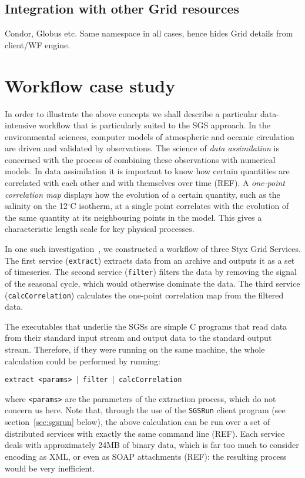 \documentclass[a4paper]{article}
\begin{document}
\subsection{Integration with other Grid resources}
Condor, Globus etc.  Same namespace in all cases, hence hides Grid details from client/WF engine.

\section{Workflow case study}
In order to illustrate the above concepts we shall describe a particular data-intensive workflow that is particularly suited to the SGS approach.  In the environmental sciences, computer models of atmospheric and oceanic circulation are driven and validated by observations.  The science of \textit{data assimilation} is concerned with the process of combining these observations with numerical models.  In data assimilation it is important to know how certain quantities are correlated with each other and with themselves over time (REF).  A \textit{one-point correlation map} displays how the evolution of a certain quantity, such as the salinity on the 12$^\circ$C isotherm, at a single point correlates with the evolution of the same quantity at its neighbouring points in the model.  This gives a characteristic length scale for key physical processes.

In one such investigation~\cite{haines:2006}, we constructed a workflow of three Styx Grid Services.  The first service (\texttt{extract}) extracts data from an archive and outputs it as a set of timeseries.  The second service (\texttt{filter}) filters the data by removing the signal of the seasonal cycle, which would otherwise dominate the data.  The third service (\texttt{calcCorrelation}) calculates the one-point correlation map from the filtered data.

The executables that underlie the SGSs are simple C programs that read data from their standard input stream and output data to the standard output stream.  Therefore, if they were running on the same machine, the whole calculation could be performed by running:

\texttt{extract <params> $|$ filter $|$ calcCorrelation}

\noindent where \texttt{<params>} are the parameters of the extraction process, which do not concern us here.  Note that, through the use of the \texttt{SGSRun} client program (see section~\ref{sec:sgsrun} below), the above calculation can be run over a set of distributed services with exactly the same command line (REF).  Each service deals with approximately 24MB of binary data, which is far too much to consider encoding as XML, or even as SOAP attachments (REF): the resulting process would be very inefficient.
\end{document}
